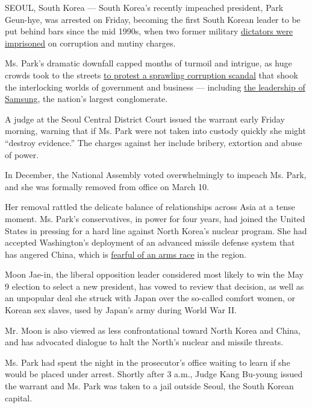 SEOUL, South Korea --- South Korea's recently impeached president, Park
Geun-hye, was arrested on Friday, becoming the first South Korean leader
to be put behind bars since the mid 1990s, when two former military
\href{http://www.nytimes.com/1995/12/22/world/south-korea-indicts-2-former-presidents-in-staging-of-1979-coup.html}{dictators
were imprisoned} on corruption and mutiny charges.

Ms. Park's dramatic downfall capped months of turmoil and intrigue, as
huge crowds took to the streets
\href{https://www.nytimes.com/2016/11/26/world/asia/korea-park-geun-hye-protests.html}{to
protest a sprawling corruption scandal} that shook the interlocking
worlds of government and business --- including
\href{https://www.nytimes.com/2017/03/09/business/jay-y-lee-samsung-trial.html}{the
leadership of Samsung}, the nation's largest conglomerate.

A judge at the Seoul Central District Court issued the warrant early
Friday morning, warning that if Ms. Park were not taken into custody
quickly she might ``destroy evidence.'' The charges against her include
bribery, extortion and abuse of power.

In December, the National Assembly voted overwhelmingly to impeach Ms.
Park, and she was formally removed from office on March 10.

Her removal rattled the delicate balance of relationships across Asia at
a tense moment. Ms. Park's conservatives, in power for four years, had
joined the United States in pressing for a hard line against North
Korea's nuclear program. She had accepted Washington's deployment of an
advanced missile defense system that has angered China, which is
\href{https://www.nytimes.com/2017/03/07/world/asia/thaad-missile-defense-us-south-korea-china.html}{fearful
of an arms race} in the region.

Moon Jae-in, the liberal opposition leader considered most likely to win
the May 9 election to select a new president, has vowed to review that
decision, as well as an unpopular deal she struck with Japan over the
so-called comfort women, or Korean sex slaves, used by Japan's army
during World War II.

Mr. Moon is also viewed as less confrontational toward North Korea and
China, and has advocated dialogue to halt the North's nuclear and
missile threats.

Ms. Park had spent the night in the prosecutor's office waiting to learn
if she would be placed under arrest. Shortly after 3 a.m., Judge Kang
Bu-young issued the warrant and Ms. Park was taken to a jail outside
Seoul, the South Korean capital.

